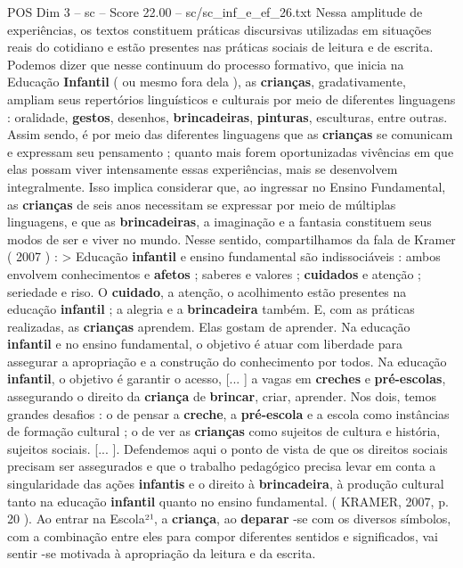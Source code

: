 \begin{textsample}{POS Dim 3 – sc – Score 22.00 – sc/sc\_inf\_e\_ef\_26.txt}
Nessa amplitude de experiências, os textos constituem práticas discursivas utilizadas em situações reais do cotidiano e estão presentes nas práticas sociais de leitura e de escrita.
Podemos dizer que nesse continuum do processo formativo, que inicia na Educação \textbf{Infantil} ( ou mesmo fora dela ), as \textbf{crianças}, gradativamente, ampliam seus repertórios linguísticos e culturais por meio de diferentes linguagens : oralidade, \textbf{gestos}, desenhos, \textbf{brincadeiras}, \textbf{pinturas}, esculturas, entre outras.
Assim sendo, é por meio das diferentes linguagens que as \textbf{crianças} se comunicam e expressam seu pensamento ; quanto mais forem oportunizadas vivências em que elas possam viver intensamente essas experiências, mais se desenvolvem integralmente.
Isso implica considerar que, ao ingressar no Ensino Fundamental, as \textbf{crianças} de seis anos necessitam se expressar por meio de múltiplas linguagens, e que as \textbf{brincadeiras}, a imaginação e a fantasia constituem seus modos de ser e viver no mundo.
Nesse sentido, compartilhamos da fala de Kramer ( 2007 ) : > Educação \textbf{infantil} e ensino fundamental são indissociáveis : ambos envolvem conhecimentos e \textbf{afetos} ; saberes e valores ; \textbf{cuidados} e atenção ; seriedade e riso.
O \textbf{cuidado}, a atenção, o acolhimento estão presentes na educação \textbf{infantil} ; a alegria e a \textbf{brincadeira} também.
E, com as práticas realizadas, as \textbf{crianças} aprendem.
Elas gostam de aprender.
Na educação \textbf{infantil} e no ensino fundamental, o objetivo é atuar com liberdade para assegurar a apropriação e a construção do conhecimento por todos.
Na educação \textbf{infantil}, o objetivo é garantir o acesso, [... ] a vagas em \textbf{creches} e \textbf{pré-escolas}, assegurando o direito da \textbf{criança} de \textbf{brincar}, criar, aprender.
Nos dois, temos grandes desafios : o de pensar a \textbf{creche}, a \textbf{pré-escola} e a escola como instâncias de formação cultural ; o de ver as \textbf{crianças} como sujeitos de cultura e história, sujeitos sociais. [... ].
Defendemos aqui o ponto de vista de que os direitos sociais precisam ser assegurados e que o trabalho pedagógico precisa levar em conta a singularidade das ações \textbf{infantis} e o direito à \textbf{brincadeira}, à produção cultural tanto na educação \textbf{infantil} quanto no ensino fundamental. ( KRAMER, 2007, p. 20 ).
Ao entrar na Escola²¹, a \textbf{criança}, ao \textbf{deparar} -se com os diversos símbolos, com a combinação entre eles para compor diferentes sentidos e significados, vai sentir -se motivada à apropriação da leitura e da escrita.

\end{textsample}
